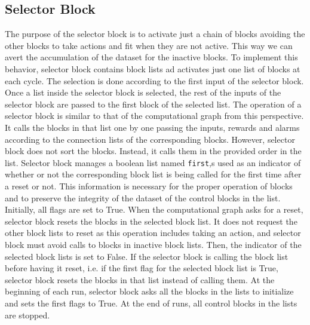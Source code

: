 \subsection{Selector Block}
The purpose of the selector block is to activate just a chain of blocks avoiding the other blocks to take actions and fit when they are not active. This way we can avert the accumulation of the dataset for the inactive blocks. To implement this behavior, selector block contains block lists ad activates just one list of blocks at each cycle. The selection is done according to the first input of the selector block. Once a list inside the selector block is selected, the rest of the inputs of the selector block are passed to the first block of the selected list. The operation of a selector block is similar to that of the computational graph from this perspective. It calls the blocks in that list one by one passing the inputs, rewards and alarms according to the connection lists of the corresponding blocks. However, selector block does not sort the blocks. Instead, it calls them in the provided order in the list. Selector block manages a boolean list named \texttt{first},s used as an indicator of whether or not the corresponding block list is being called for the first time after a reset or not. This information is necessary for the proper operation of blocks and to preserve the integrity of the dataset of the control blocks in the list. Initially, all flags are set to True. When the computational graph asks for a reset, selector block resets the blocks in the selected block list. It does not request the other block lists to reset as this operation includes taking an action, and selector block must avoid calls to blocks in inactive block lists. Then, the indicator of the selected block lists is set to False. If the selector block is calling the block list before having it reset, i.e. if the first flag for the selected block list is True, selector block resets the blocks in that list instead of calling them. 
At the beginning of each run, selector block asks all the blocks in the lists to initialize and sets the first flags to True. At the end of runs, all control blocks in the lists are stopped. 




